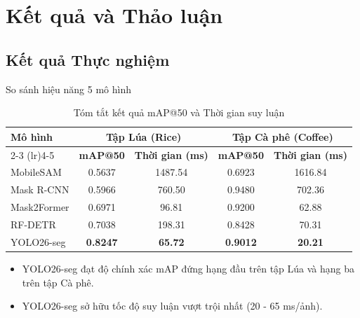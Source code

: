 \section{Kết quả và Thảo luận}

\subsection{Kết quả Thực nghiệm}
\begin{frame}{So sánh hiệu năng 5 mô hình}
  \vspace{-0.2cm}
  \begin{table}
    \centering
    \caption{Tóm tắt kết quả mAP@50 và Thời gian suy luận}
    \footnotesize
    \begin{tabular}{lcccc}
      \toprule
      \multirow{2}{*}{\textbf{Mô hình}} & \multicolumn{2}{c}{\textbf{Tập Lúa (Rice)}} & \multicolumn{2}{c}{\textbf{Tập Cà phê (Coffee)}}                                             \\
      \cmidrule(lr){2-3} \cmidrule(lr){4-5}
                                        & \textbf{mAP@50}                             & \textbf{Thời gian (ms)}                          & \textbf{mAP@50} & \textbf{Thời gian (ms)} \\
      \midrule
      MobileSAM                         & 0.5637                                      & 1487.54                                          & 0.6923          & 1616.84                 \\
      Mask R-CNN                        & 0.5966                                      & 760.50                                           & 0.9480          & 702.36                  \\
      Mask2Former                       & 0.6971                                      & 96.81                                            & 0.9200          & 62.88                   \\
      RF-DETR                           & 0.7038                                      & 198.31                                           & 0.8428          & 70.31                   \\
      YOLO26-seg                        & \textbf{0.8247}                             & \textbf{65.72}                                   & \textbf{0.9012} & \textbf{20.21}          \\
      \bottomrule
    \end{tabular}
  \end{table}

  \vspace{0.2cm}
  \begin{itemize}
    \item[-] YOLO26-seg đạt độ chính xác mAP đứng hạng đầu trên tập Lúa và hạng ba trên tập Cà phê.
    \item[-] YOLO26-seg sở hữu tốc độ suy luận vượt trội nhất (20 - 65 ms/ảnh).
  \end{itemize}
\end{frame}

